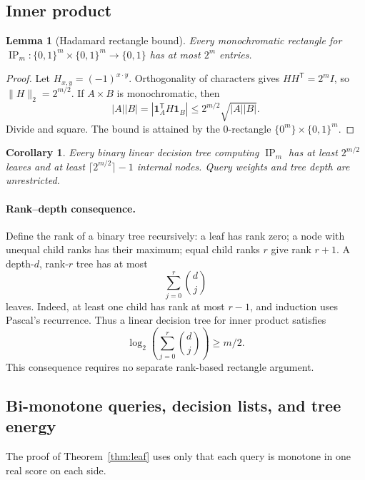 \documentclass[11pt]{article}
\newtheorem{lemma}[theorem]{Lemma}
\newtheorem{corollary}[theorem]{Corollary}
\theoremstyle{definition}
\newcommand{\bits}{\{0,1\}}
\newcommand{\ip}{\operatorname{IP}}
\begin{document}
\subsection{Inner product}
\begin{lemma}[Hadamard rectangle bound]\label{lem:IPrectangle}
Every monochromatic rectangle for \(\ip_m:\bits^m\times\bits^m\to\bits\) has at most \(2^m\) entries.
\end{lemma}
\begin{proof}
Let \(H_{x,y}=(-1)^{x\cdot y}\). Orthogonality of characters gives \(HH^\mathsf T=2^m I\), so \(\|H\|_2=2^{m/2}\).
If \(A\times B\) is monochromatic, then
\[
 |A||B|
 =|\mathbf1_A^\mathsf T H\mathbf1_B|
 \le2^{m/2}\sqrt{|A||B|}.
\]
Divide and square. The bound is attained by the \(0\)-rectangle \(\{0^m\}\times\bits^m\).
\end{proof}

\begin{corollary}\label{cor:IPtree}
Every binary linear decision tree computing \(\ip_m\) has at least \(2^{m/2}\) leaves and at least \(\lceil2^{m/2}\rceil-1\) internal nodes. Query weights and tree depth are unrestricted.
\end{corollary}

\paragraph{Rank--depth consequence.}
Define the rank of a binary tree recursively: a leaf has rank zero; a node with unequal child ranks has their maximum; equal child ranks \(r\) give rank \(r+1\).
A depth-\(d\), rank-\(r\) tree has at most
\[
 \sum_{j=0}^{r}\binom dj
\]
leaves. Indeed, at least one child has rank at most \(r-1\), and induction uses Pascal's recurrence. Thus a linear decision tree for inner product satisfies
\[
 \log_2\left(\sum_{j=0}^{r}\binom dj\right)\ge m/2.
\]
This consequence requires no separate rank-based rectangle argument.

\subsection{Bi-monotone queries, decision lists, and tree energy}\label{sec:variants}
The proof of Theorem~\ref{thm:leaf} uses only that each query is monotone in one real score on each side.
\end{document}
